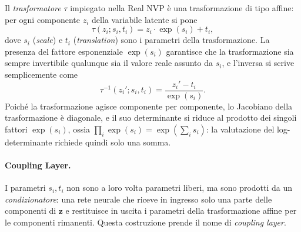 Il \emph{trasformatore} $\tau$ impiegato nella Real NVP è una trasformazione di tipo affine: per ogni componente $z_i$ della variabile latente si pone
\begin{equation}
    \tau(z_i; s_i, t_i) = z_i \cdot \exp(s_i) + t_i,
    \label{eq:affine_transform}
\end{equation}
dove $s_i$ (\emph{scale}) e $t_i$ (\emph{translation}) sono i parametri della trasformazione. La presenza del fattore esponenziale $\exp(s_i)$ garantisce che la trasformazione sia sempre invertibile qualunque sia il valore reale assunto da $s_i$, e l'inversa si scrive semplicemente come
\begin{equation}
    \tau^{-1}(z_i'; s_i, t_i) = \frac{z_i' - t_i}{\exp(s_i)}.
    \label{eq:affine_transform_inv}
\end{equation}
Poiché la trasformazione agisce componente per componente, lo Jacobiano della trasformazione è diagonale, e il suo determinante si riduce al prodotto dei singoli fattori $\exp(s_i)$, ossia $\prod_i \exp(s_i) = \exp\left(\sum_i s_i\right)$: la valutazione del log-determinante richiede quindi solo una somma.

\paragraph*{Coupling Layer.}

I parametri $s_i, t_i$ non sono a loro volta parametri liberi, ma sono prodotti da un \emph{condizionatore}: una rete neurale che riceve in ingresso solo una parte delle componenti di $\mathbf{z}$ e restituisce in uscita i parametri della trasformazione affine per le componenti rimanenti. Questa costruzione prende il nome di \emph{coupling layer}.

